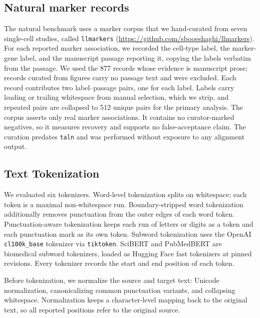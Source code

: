 \documentclass[pdflatex,lineno,referee,sn-vancouver-num]{sn-jnl}
\theoremstyle{thmstyleone}
\theoremstyle{thmstylethree}
\theoremstyle{thmstyletwo}
\begin{document}
\subsection{Natural marker records}
The natural benchmark uses a marker corpus that we hand-curated from seven single-cell studies, called \texttt{llmarkers} (\href{https://github.com/sbooeshaghi/llmarkers}{https://github.com/sbooeshaghi/llmarkers}). For each reported marker association, we recorded the cell-type label, the marker-gene label, and the manuscript passage reporting it, copying the labels verbatim from the passage. We used the 877 records whose evidence is manuscript prose; records curated from figures carry no passage text and were excluded. Each record contributes two label--passage pairs, one for each label. Labels carry leading or trailing whitespace from manual selection, which we strip, and repeated pairs are collapsed to 512 unique pairs for the primary analysis. The corpus asserts only real marker associations. It contains no curator-marked negatives, so it measures recovery and supports no false-acceptance claim. The curation predates \texttt{taln} and was performed without exposure to any alignment output.

\subsection{Text Tokenization}
We evaluated six tokenizers. Word-level tokenization splits on whitespace; each token is a maximal non-whitespace run. Boundary-stripped word tokenization additionally removes punctuation from the outer edges of each word token. Punctuation-aware tokenization keeps each run of letters or digits as a token and each punctuation mark as its own token. Subword tokenization uses the OpenAI \texttt{cl100k\_base} tokenizer via \texttt{tiktoken}. SciBERT and PubMedBERT are biomedical subword tokenizers, loaded as Hugging Face fast tokenizers at pinned revisions. Every tokenizer records the start and end position of each token.

Before tokenization, we normalize the source and target text: Unicode normalization, canonicalizing common punctuation variants, and collapsing whitespace. Normalization keeps a character-level mapping back to the original text, so all reported positions refer to the original source.
\end{document}
